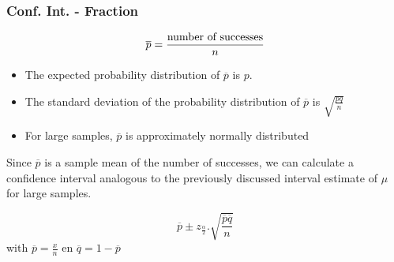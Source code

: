 \documentclass[aspectratio=169]{beamer}
\begin{document}
\begin{frame}
  \frametitle{Conf. Int. - Fraction}
  \[ \overline{p} = \frac{\textnormal{number of successes}}{n} \]
  \begin{itemize}
    \item The expected probability distribution of $\overline{p}$ is $p$.
    \item The standard deviation of the probability distribution of $\overline{p}$ is $\sqrt{\frac{pq}{n}}$
    \item For large samples, $\overline{p}$ is approximately normally distributed
  \end{itemize}

  Since $\overline{p}$ is a sample mean of the number of successes, we can calculate a confidence interval analogous to the previously discussed interval estimate of $\mu$ for large samples.
  
  \[ \overline{p} \pm z_{\frac{\alpha}{2}}.\sqrt{\frac{\overline{p}\overline{q}}{n}} \]
  with $\overline{p} = \frac{x}{n}$ en $\overline{q} = 1- \overline{p}$
  
\end{frame}
\end{document}
